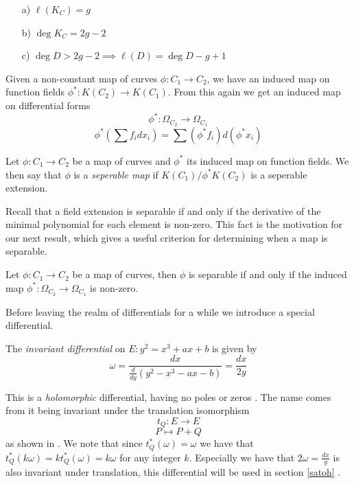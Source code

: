 \begin{cor} \label{rrcor}
 \begin{enumerate}
Let $K_C$ be a canonical divisor, then
  \item[a)] $\ell(K_C) = g$
  \item[b)] $\deg K_C = 2g - 2$
  \item[c)] $\deg D > 2g - 2 \implies \ell(D) = \deg D - g + 1$ 
 \end{enumerate}
\end{cor}

Given a non-constant map of curves $\phi: C_1 \rightarrow C_2$, we have an induced map
on function fields $\phi^*: K(C_2) \rightarrow K(C_1)$. From this again we get an induced
map on differential forms
$$ \phi^*: \Omega_{C_2} \rightarrow \Omega_{C_1} $$
$$ \phi^*\left(\sum f_i dx_i\right) = \sum (\phi^* f_i) d(\phi^* x_i) $$
\label{diff}

\begin{mydef} 
 Let $\phi: C_1 \rightarrow C_2$ be a map of curves and $\phi^*$ its induced map on
function fields. We then say that $\phi$ is a \emph{seperable map} if
$K(C_1)/\phi^* K(C_2)$ is a seperable extension.
\end{mydef}

Recall that a field extension is separable if and only if the derivative of the minimal
polynomial for each element is non-zero. This fact is the motivation for our next result,
which gives a useful criterion for determining when a map is separable.

\begin{prop} \label{diffsep}
 Let $\phi: C_1 \rightarrow C_2$ be a map of curves, then $\phi$ is separable if and only if
the induced map $\phi^*: \Omega_{C_2} \rightarrow \Omega_{C_1} $ is non-zero.
\end{prop}

Before leaving the realm of differentials for a while we introduce a special differential.
\begin{mydef}
The \emph{invariant differential} on $E: y^2 = x^3 + ax + b$ is given by
$$\omega = \frac{dx}{\frac{d}{dy}\left(y^2 - x^3  - ax - b\right)} = \frac{dx}{2y} $$
\end{mydef}
This is a \emph{holomorphic} differential, having no poles or zeros \cite{AEC}. The name comes from it
being invariant under the translation isomorphism
$$ t_Q: E \rightarrow E$$
$$ P \mapsto P + Q$$
as shown in \cite{AEC}. We note that since $t_Q^*(\omega) = \omega$ we have that
$t_Q^*(k\omega) = k t_Q^*(\omega) = k\omega$ for any integer $k$. Especially we have that
$2\omega = \frac{dx}{y}$ is also invariant under translation, this differential will be used
in section \ref{satoh} \label{invariant}.


